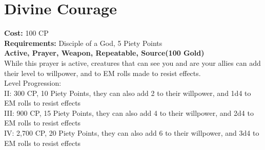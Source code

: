\section{Divine Courage}\label{prayer:divineCourage}
\textbf{Cost:} 100 CP\\
\textbf{Requirements:} Disciple of a God, 5 Piety Points \\
\textbf{Active, Prayer, Weapon, Repeatable, Source(100 Gold)}\\
While this prayer is active, creatures that can see you and are your allies can add their level to willpower, and to EM rolls made to resist effects.
\\
Level Progression:\\
II: 300 CP, 10 Piety Points, they can also add 2 to their willpower, and 1d4 to EM rolls to resist effects\\
III: 900 CP, 15 Piety Points, they can also add 4 to their willpower, and 2d4 to EM rolls to resist effects\\
IV: 2,700 CP, 20 Piety Points, they can also add 6 to their willpower, and 3d4 to EM rolls to resist effects\\